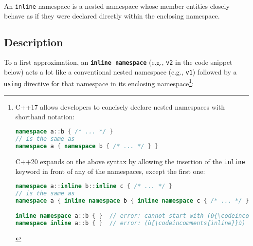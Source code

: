 

\setcounter{table}{0}
\setcounter{footnote}{0}
\setcounter{lstlisting}{0}


An \texttt{inline} namespace is a nested namespace whose member entities
closely behave as if they were declared directly within the enclosing
namespace.

\subsection[Description]{Description}\label{description-inlinenamespace}

To a first approximation, an \textbf{\texttt{inline}~\texttt{namespace}}
(e.g., \texttt{v2} in the code snippet below) acts a lot like a
conventional nested namespace (e.g., \texttt{v1}) followed by a
\texttt{using} directive for that namespace in its enclosing namespace{\cprotect\footnote{C++17 allows developers to concisely declare nested
namespaces with shorthand notation:
\begin{lstlisting}[language=C++, basicstyle={\ttfamily\footnotesize}]
namespace a::b { /* ... */ }
// is the same as
namespace a { namespace b { /* ... */ } }
\end{lstlisting}
C++20 expands on the above syntax by allowing the insertion of the
\texttt{inline} keyword in front of any of the namespaces, except the
first one:
\begin{lstlisting}[language=C++, basicstyle={\ttfamily\footnotesize}]
namespace a::inline b::inline c { /* ... */ }
// is the same as
namespace a { inline namespace b { inline namespace c { /* ... */ } } }

inline namespace a::b { }  // error: cannot start with (ù{\codeincomments{inline}}ù) for compound namespace names
namespace inline a::b { }  // error: (ù{\codeincomments{inline}}ù) at front of sequence explicitly disallowed
\end{lstlisting}
      }}:

